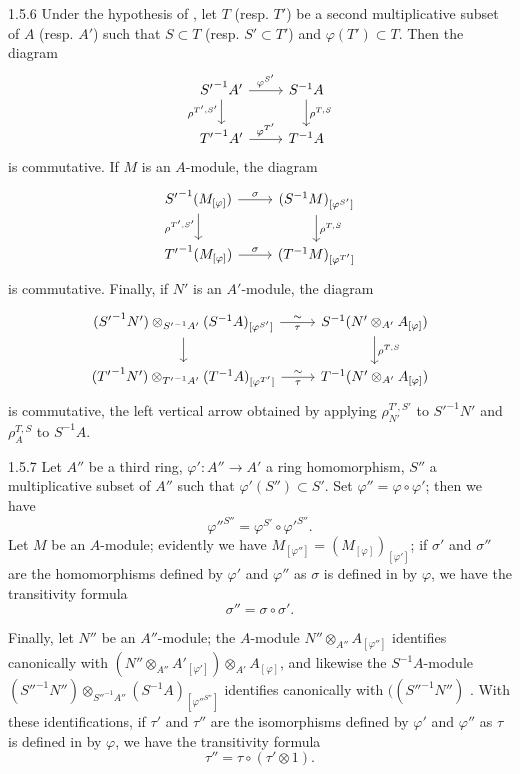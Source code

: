 \begin{env}{1.5.6}
\label{env-0.1.5.6}
Under the hypothesis of , let $T$ (resp. $T'$) be a second multiplicative subset of $A$
(resp. $A'$) such that $S\subset T$ (resp. $S'\subset T'$) and $\varphi(T')\subset T$. Then the diagram
\[
  \begin{tikzcd}
    {S'}^{-1}A'\ar[r,"\varphi^{S'}"]\ar[d,"\rho^{T',S'}"'] & S^{-1}A\ar[d,"\rho^{T,S}"]\\
    {T'}^{-1}A'\ar[r,"\varphi^{T'}"] & T^{-1}A
  \end{tikzcd}
\]
is commutative. If $M$ is an $A$-module, the diagram
\[
  \begin{tikzcd}
    {S'}^{-1}(M_{[\varphi]})\ar[r,"\sigma"]\ar[d,"\rho^{T',S'}"'] &
    (S^{-1}M)_{[\varphi^{S'}]}\ar[d,"\rho^{T,S}"]\\
    {T'}^{-1}(M_{[\varphi]})\ar[r,"\sigma"] & (T^{-1}M)_{[\varphi^{T'}]}
  \end{tikzcd}
\]
is commutative. Finally, if $N'$ is an $A'$-module, the diagram
\[
  \begin{tikzcd}
    ({S'}^{-1}N')\otimes_{{S'}^{-1}A'}(S^{-1}A)_{[\varphi^{S'}]}\ar[r,"\sim","\tau"'] \ar[d] &
    S^{-1}(N'\otimes_{A'}A_{[\varphi]})\ar[d,"\rho^{T,S}"]\\
    ({T'}^{-1}N')\otimes_{{T'}^{-1}A'}(T^{-1}A)_{[\varphi^{T'}]}
    \ar[r,"\sim","\tau"'] & T^{-1}(N'\otimes_{A'}A_{[\varphi]})
  \end{tikzcd}
\]
is commutative, the left vertical arrow obtained by applying
$\rho_{N'}^{T',S'}$ to ${S'}^{-1}N'$ and $\rho_A^{T,S}$ to $S^{-1}A$.
\end{env}

\begin{env}{1.5.7}
\label{env-0.1.5.7}
Let $A''$ be a third ring, $\varphi'\colon A''\to A'$ a ring homomorphism,
$S''$ a multiplicative subset of $A''$ such that $\varphi'(S'')\subset S'$. Set
$\varphi''=\varphi\circ\varphi'$; then we have
\[
  {\varphi''}^{S''}=\varphi^{S'}\circ{\varphi'}^{S''}.
\]
Let $M$ be an $A$-module; evidently we have $M_{[\varphi'']}=(M_{[\varphi]})_{[\varphi']}$;
if $\sigma'$ and $\sigma''$ are the homomorphisms defined by $\varphi'$ and $\varphi''$ as
$\sigma$ is defined in  by $\varphi$, we have the transitivity formula
\[
  \sigma''=\sigma\circ\sigma'.
\]

Finally, let $N''$ be an $A''$-module; the $A$-module $N''\otimes_{A''}A_{[\varphi'']}$
identifies canonically with
$(N''\otimes_{A''}{A'}_{[\varphi']})\otimes_{A'}A_{[\varphi]}$,
and likewise the $S^{-1}A$-module
${({S''}^{-1}N'')\otimes_{{S''}^{-1}A''}(S^{-1}A)_{[{\varphi''}^{S''}]}}$ identifies
canonically with
$(({S''}^{-1}N'')$ . With these identifications, if $\tau'$
and $\tau''$ are the isomorphisms defined by $\varphi'$ and $\varphi''$ as $\tau$ is defined
in  by $\varphi$, we have the transitivity formula
\[
  \tau''=\tau\circ(\tau'\otimes 1).
\]
\end{env}

